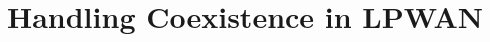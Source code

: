 \documentclass[sigconf]{acmart}
\begin{document}
\title{Handling Coexistence in LPWAN}



%
%
%
%
%
%
%
\end{document}
